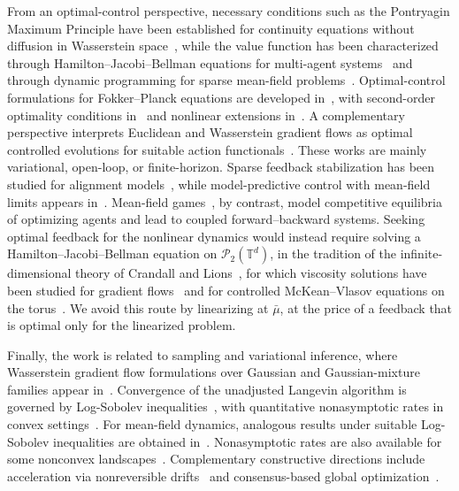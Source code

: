 \documentclass[11pt]{article}
\numberwithin{equation}{section}
\theoremstyle{definition}
\newcommand{\T}{\mathbb{T}}
\newcommand{\Pcal}{\mathcal{P}}
\begin{document}
From an optimal-control perspective, necessary conditions such as the Pontryagin Maximum Principle have been established for continuity equations without diffusion in Wasserstein space~\cite{BonnetRossi2019}, while the value function has been characterized through Hamilton--Jacobi--Bellman equations for multi-agent systems~\cite{JimenezMarigondaQuincampoix2020} and through dynamic programming for sparse mean-field problems~\cite{CavagnariMarigondaPiccoli2020}.
Optimal-control formulations for Fokker--Planck equations are developed in~\cite{AnnunziatoBorzi2010}, with second-order optimality conditions in~\cite{AronnaTroltzsch2021} and nonlinear extensions in~\cite{Barbu2023}.
A complementary perspective interprets Euclidean and Wasserstein gradient flows as optimal controlled evolutions for suitable action functionals~\cite{ChenGeorgiouPavon2025}.
These works are mainly variational, open-loop, or finite-horizon.
Sparse feedback stabilization has been studied for alignment models~\cite{CaponigroEtAl2013}, while model-predictive control with mean-field limits appears in~\cite{AlbiPareschi2018}.
Mean-field games~\cite{LasryLions2007}, by contrast, model competitive equilibria of optimizing agents and lead to coupled forward--backward systems.
Seeking optimal feedback for the nonlinear dynamics would instead require solving a Hamilton--Jacobi--Bellman equation on $\Pcal_2(\T^d)$, in the tradition of the infinite-dimensional theory of Crandall and Lions~\cite{CrandallLions1985}, for which viscosity solutions have been studied for gradient flows~\cite{ConfortiKraaijTonon2023, ConfortiKraaijTamaniniTonon2026} and for controlled McKean--Vlasov equations on the torus~\cite{SonerYan2024}.
We avoid this route by linearizing at $\bar\mu$, at the price of a feedback that is optimal only for the linearized problem.

Finally, the work is related to sampling and variational inference, where Wasserstein gradient flow formulations over Gaussian and Gaussian-mixture families appear in~\cite{LambertEtAl2022}.
Convergence of the unadjusted Langevin algorithm is governed by Log-Sobolev inequalities~\cite{BakryEmery1985}, with quantitative nonasymptotic rates in convex settings~\cite{Dalalyan2017,VempalaWibisono2023}.
For mean-field dynamics, analogous results under suitable Log-Sobolev inequalities are obtained in~\cite{Chizat2022}.
Nonasymptotic rates are also available for some nonconvex landscapes~\cite{RaginskyRakhlinTelgarsky2017}.
Complementary constructive directions include acceleration via nonreversible drifts~\cite{LelievreNierPavliotis2013,DuncanNuskenPavliotis2017} and consensus-based global optimization~\cite{CarrilloEtAl2018}.
\end{document}
